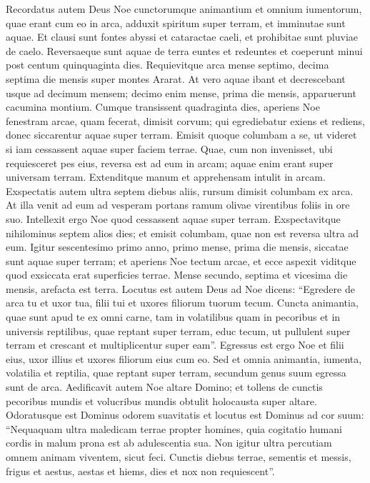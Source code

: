 \begin{biblechapter}  
\verse Recordatus autem Deus Noe cunctorumque animantium et omnium iumentorum, quae erant cum eo in arca, adduxit spiritum super terram, et imminutae sunt aquae. 
\verse Et clausi sunt fontes abyssi et cataractae caeli, et prohibitae sunt pluviae de caelo. 
\verse Reversaeque sunt aquae de terra euntes et redeuntes et coeperunt minui post centum quinquaginta dies. 
\verse Requievitque arca mense septimo, decima septima die mensis super montes Ararat. 
\verse At vero aquae ibant et decrescebant usque ad decimum mensem; decimo enim mense, prima die mensis, apparuerunt cacumina montium. 
\verse Cumque transissent quadraginta dies, aperiens Noe fenestram arcae, quam fecerat, dimisit corvum; 
\verse qui egrediebatur exiens et rediens, donec siccarentur aquae super terram. 
\verse Emisit quoque columbam a se, ut videret si iam cessassent aquae super faciem terrae. 
\verse Quae, cum non invenisset, ubi requiesceret pes eius, reversa est ad eum in arcam; aquae enim erant super universam terram. Extenditque manum et apprehensam intulit in arcam. 
\verse Exspectatis autem ultra septem diebus aliis, rursum dimisit columbam ex arca.  
\verse At illa venit ad eum ad vesperam portans ramum olivae virentibus foliis in ore suo. Intellexit ergo Noe quod cessassent aquae super terram. 
\verse Exspectavitque nihilominus septem alios dies; et emisit columbam, quae non est reversa ultra ad eum. 
\verse Igitur sescentesimo primo anno, primo mense, prima die mensis, siccatae sunt aquae super terram; et aperiens Noe tectum arcae, et ecce aspexit viditque quod exsiccata erat superficies terrae. 
\verse Mense secundo, septima et vicesima die mensis, arefacta est terra. 
\verse Locutus est autem Deus ad Noe dicens: 
\verse “Egredere de arca tu et uxor tua, filii tui et uxores filiorum tuorum tecum. 
\verse Cuncta animantia, quae sunt apud te ex omni carne, tam in volatilibus quam in pecoribus et in universis reptilibus, quae reptant super terram, educ tecum, ut pullulent super terram et crescant et multiplicentur super eam”. 
\verse Egressus est ergo Noe et filii eius, uxor illius et uxores filiorum eius cum eo. 
\verse Sed et omnia animantia, iumenta, volatilia et reptilia, quae reptant super terram, secundum genus suum egressa sunt de arca. 
\verse Aedificavit autem Noe altare Domino; et tollens de cunctis pecoribus mundis et volucribus mundis obtulit holocausta super altare. 
\verse Odoratusque est Dominus odorem suavitatis et locutus est Dominus ad cor suum: “Nequaquam ultra maledicam terrae propter homines, quia cogitatio humani cordis in malum prona est ab adulescentia sua. Non igitur ultra percutiam omnem animam viventem, sicut feci. 
\verse Cunctis diebus terrae, sementis et messis, frigus et aestus, aestas et hiems, dies et nox non requiescent”. 
\end{biblechapter}

